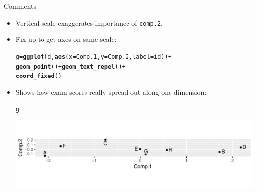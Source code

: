 \documentclass[unknownkeysallowed]{beamer}\usepackage[]{graphicx}\usepackage[]{color}
\makeatletter
\def\maxwidth{ %
  \ifdim\Gin@nat@width>\linewidth
    \linewidth
  \else
    \Gin@nat@width
  \fi
}
\newcommand{\hlopt}[1]{\textcolor[rgb]{0,0,0}{#1}}%
\newcommand{\hlstd}[1]{\textcolor[rgb]{0.345,0.345,0.345}{#1}}%
\newcommand{\hlkwb}[1]{\textcolor[rgb]{0.69,0.353,0.396}{#1}}%
\newcommand{\hlkwc}[1]{\textcolor[rgb]{0.333,0.667,0.333}{#1}}%
\newcommand{\hlkwd}[1]{\textcolor[rgb]{0.737,0.353,0.396}{\textbf{#1}}}%
\newenvironment{kframe}{%
 \def\at@end@of@kframe{}%
 \ifinner\ifhmode%
  \def\at@end@of@kframe{\end{minipage}}%
  \begin{minipage}{\columnwidth}%
 \fi\fi%
 \def\FrameCommand##1{\hskip\@totalleftmargin \hskip-\fboxsep
 \colorbox{shadecolor}{##1}\hskip-\fboxsep
     \hskip-\linewidth \hskip-\@totalleftmargin \hskip\columnwidth}%
 \MakeFramed {\advance\hsize-\width
   \@totalleftmargin\z@ \linewidth\hsize
   \@setminipage}}%
 {\par\unskip\endMakeFramed%
 \at@end@of@kframe}
\newenvironment{knitrout}{}{} %
\makeatother
\begin{document}
\begin{frame}[fragile]{Comments}
  
  \begin{itemize}
  \item Vertical scale exaggerates importance of \texttt{comp.2}.
    \item Fix up to get axes on same scale:
\begin{knitrout}
\color{fgcolor}\begin{kframe}
\begin{alltt}
\hlstd{g}\hlkwb{=}\hlkwd{ggplot}\hlstd{(d,}\hlkwd{aes}\hlstd{(}\hlkwc{x}\hlstd{=Comp.1,}\hlkwc{y}\hlstd{=Comp.2,}\hlkwc{label}\hlstd{=id))}\hlopt{+}
  \hlkwd{geom_point}\hlstd{()}\hlopt{+}\hlkwd{geom_text_repel}\hlstd{()}\hlopt{+}
  \hlkwd{coord_fixed}\hlstd{()}
\end{alltt}
\end{kframe}
\end{knitrout}
\item Shows how exam scores really spread out along one dimension:

\begin{knitrout}
\color{fgcolor}\begin{kframe}
\begin{alltt}
\hlstd{g}
\end{alltt}
\end{kframe}
\includegraphics[width=\maxwidth]{figure/eqsc2-1} 

\end{knitrout}
  
  \end{itemize}

\end{frame}
\end{document}
